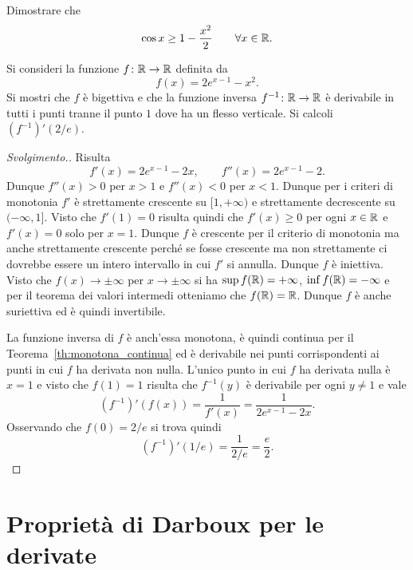 \begin{exercise}
Dimostrare che
\[
  \cos x \ge 1- \frac{x^2}{2} \qquad \forall x \in {\mathbb R}.
\]
\end{exercise}

\begin{exercise}
Si consideri la funzione $f\colon {\mathbb R} \to {\mathbb R}$ definita da
\[
  f(x) = 2e^{x-1} - x^2.
\]
Si mostri che $f$ è bigettiva e
che la funzione inversa $f^{-1}\colon {\mathbb R} \to {\mathbb R}$ è derivabile in
tutti i punti tranne il punto $1$ dove ha un flesso verticale.
Si calcoli $(f^{-1})'(2/e)$.
\end{exercise}
\begin{proof}[Svolgimento.]
Risulta
\[
  f'(x) = 2e^{x-1} - 2x, \qquad f''(x) = 2e^{x-1}-2.
\]
Dunque $f''(x) > 0$ per $x > 1$ e $f''(x)< 0$ per $x<1$.
Dunque per i criteri di monotonia
$f'$ è strettamente crescente su $[1,+\infty)$ e strettamente
decrescente su $(-\infty, 1]$. Visto che $f'(1)=0$ risulta quindi che
$f'(x)\ge 0$ per ogni $x\in {\mathbb R}$ e $f'(x)=0$ solo per $x=1$.
Dunque $f$ è crescente per il criterio di monotonia ma anche
strettamente crescente perché se fosse crescente ma non strettamente
ci dovrebbe essere un intero intervallo in cui $f'$ si annulla.
Dunque $f$ è iniettiva. Visto che $f(x)\to \pm\infty$ per $x\to \pm\infty$
si ha $\sup f({\mathbb R}) = +\infty$, $\inf f({\mathbb R}) = -\infty$ e per il teorema dei valori intermedi
otteniamo che $f({\mathbb R})={\mathbb R}$. 
Dunque $f$ è anche suriettiva ed è quindi invertibile.

La funzione inversa di $f$ è anch'essa monotona, 
è quindi continua per il Teorema~\ref{th:monotona_continua} ed 
è derivabile nei punti corrispondenti ai punti in cui $f$ ha derivata non nulla.
L'unico punto in cui $f$ ha derivata nulla è $x=1$ e visto che $f(1) = 1$ risulta
che $f^{-1}(y)$ è derivabile per ogni $y\neq 1$ e vale
\[
  (f^{-1})'(f(x)) = \frac{1}{f'(x)} = \frac{1}{2 e^{x-1}-2x}.
\]
Osservando che $f(0)=2/e$ si trova quindi
\[
  (f^{-1})'(1/e) = \frac{1}{2/e} = \frac e 2.
\]
\end{proof}

\section{Proprietà di Darboux per le derivate}

